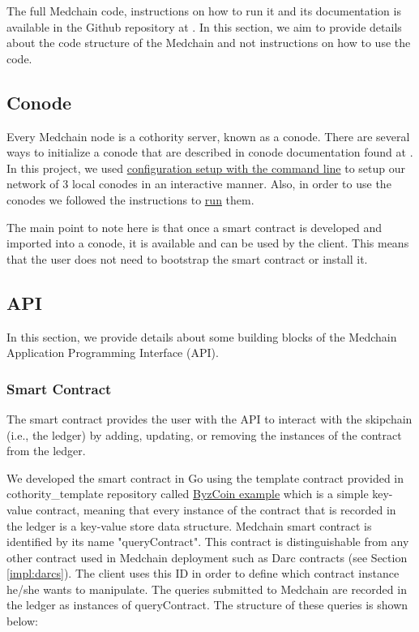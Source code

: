 The full Medchain code, instructions on how to run it and its documentation is available in the Github repository at \cite{medchain:2020}. In this section, we aim to provide details about the code structure of the Medchain and not instructions on how to use the code.  

\subsection{Conode}
Every Medchain node is a cothority server, known as a conode. There are several ways to initialize a conode that are described in conode documentation found at \cite{conode:2019}. In this project, we used \href{https://github.com/dedis/cothority/blob/master/conode/README.md#option-1-computer-configuration-setup-with-the-command-line}{configuration setup with the command line} to setup our network of 3 local conodes in an interactive manner. Also, in order to use the conodes we followed the instructions to \href{https://github.com/dedis/cothority/blob/master/conode/README.md#option-1-computer-run-with-the-command-line}{run} them. 

The main point to note here is that once a smart contract is developed and imported into a conode, it is available and can be used by the client. This means that the user does not need to bootstrap the smart contract or install it.  

\subsection{API}
In this section, we provide details about some building blocks of the Medchain Application Programming Interface (API). 

\subsubsection{Smart Contract} \label{impl:smart_contract}
The smart contract provides the user with the API to interact with the skipchain (i.e., the ledger) by adding, updating, or removing the instances of the contract from the ledger. 

We developed the smart contract in Go using the template contract provided in cothority\_template repository called  \href{https://github.com/dedis/cothority_template/tree/master/byzcoin}{ByzCoin example} which is a simple key-value contract, meaning that every instance of the contract that is recorded in the ledger is a key-value store data structure. Medchain smart contract is identified by its name "queryContract". This contract is distinguishable from any other contract used in Medchain deployment such as Darc contracts (see Section \ref{impl:darcs}). The client uses this ID in order to define which contract instance he/she wants to manipulate. The queries submitted to Medchain are recorded in the ledger as instances of queryContract. The structure of these queries is shown below: 

